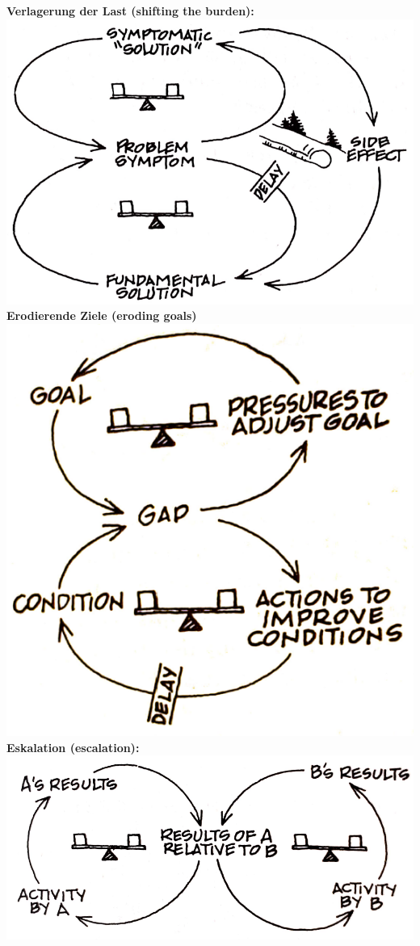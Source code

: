 \begin{multicols}{3}
	\textbf{Verlagerung der Last (shifting the burden):}\\
	\includegraphics[width=\linewidth]{pictures/archetype4}\\
	\vfill\null
	\columnbreak
	\textbf{Erodierende Ziele (eroding goals)}\\
	\includegraphics[width=0.8\linewidth]{pictures/archetype5}\\
	\vfill\null
	\columnbreak
	\textbf{Eskalation (escalation):}\\
	\includegraphics[width=\linewidth]{pictures/archetype6}\\
\end{multicols}
